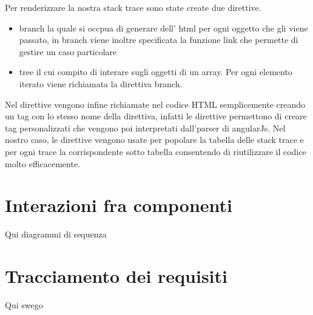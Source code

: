 Per renderizzare la nostra stack trace sono state create due direttive.
\begin{itemize}
	\item branch la quale si occpua di generare dell' html per ogni oggetto che gli viene passato,
  		in branch viene inoltre specificata la funzione link che permette di gestire un caso particolare
 	\item tree il cui compito di interare sugli oggetti di un array. Per ogni elemento iterato viene richiamata
  		la direttiva branch.
\end{itemize}

Nel direttive vengono infine richiamate nel codice HTML semplicemente creando un
tag con lo stesso nome della direttiva, infatti le direttive permettono di creare
tag personalizzati che vengono poi interpretati dall'parser di angularJs.
Nel nostro caso, le direttive vengono usate per popolare la tabella delle stack trace
e per ogni trace la corrispondente sotto tabella consentendo di riutilizzare il codice
molto efficacemente.



\section{Interazioni fra componenti}
\label{sec:Interazioni}
Qui diagrammi di sequenza

\section{Tracciamento dei requisiti}
\label{sec:Tracciamento}
Qui swego 

